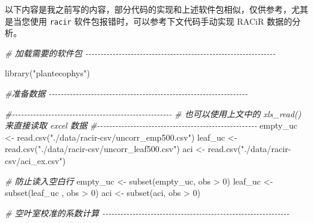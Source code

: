\documentclass[
]{krantz}
\makeatletter
\newenvironment{Shaded}{\begin{snugshade}}{\end{snugshade}}
\newcommand{\CommentTok}[1]{\textcolor[rgb]{0.56,0.35,0.01}{\textit{#1}}}
\newcommand{\DecValTok}[1]{\textcolor[rgb]{0.00,0.00,0.81}{#1}}
\newcommand{\FunctionTok}[1]{\textcolor[rgb]{0.00,0.00,0.00}{#1}}
\newcommand{\NormalTok}[1]{#1}
\newcommand{\OtherTok}[1]{\textcolor[rgb]{0.56,0.35,0.01}{#1}}
\newcommand{\SpecialCharTok}[1]{\textcolor[rgb]{0.00,0.00,0.00}{#1}}
\newcommand{\StringTok}[1]{\textcolor[rgb]{0.31,0.60,0.02}{#1}}
\newenvironment{kframe}{%
\medskip{}
\setlength{\fboxsep}{.8em}
 \def\at@end@of@kframe{}%
 \ifinner\ifhmode%
  \def\at@end@of@kframe{\end{minipage}}%
  \begin{minipage}{\columnwidth}%
 \fi\fi%
 \def\FrameCommand##1{\hskip\@totalleftmargin \hskip-\fboxsep
 \colorbox{shadecolor}{##1}\hskip-\fboxsep
     \hskip-\linewidth \hskip-\@totalleftmargin \hskip\columnwidth}%
 \MakeFramed {\advance\hsize-\width
   \@totalleftmargin\z@ \linewidth\hsize
   \@setminipage}}%
 {\par\unskip\endMakeFramed%
 \at@end@of@kframe}
\renewenvironment{Shaded}{\begin{kframe}}{\end{kframe}}
\makeatother
\begin{document}
以下内容是我之前写的内容，部分代码的实现和上述软件包相似，仅供参考，尤其是当您使用 \texttt{racir} 软件包报错时，可以参考下文代码手动实现 RACiR 数据的分析。

\begin{Shaded}
\begin{Highlighting}[]
\CommentTok{\# 加载需要的软件包  {-}{-}{-}{-}{-}{-}{-}{-}{-}{-}{-}{-}{-}{-}{-}{-}{-}{-}{-}{-}{-}{-}{-}{-}{-}{-}{-}{-}{-}{-}{-}{-}{-}{-}{-}{-}{-}{-}{-}{-}{-}{-}{-}{-}{-}{-}{-}{-}{-}{-}{-}{-}{-}{-}{-}{-}{-}{-}{-}{-}{-}{-}{-}}

\FunctionTok{library}\NormalTok{(}\StringTok{"plantecophys"}\NormalTok{)}

\CommentTok{\#准备数据 {-}{-}{-}{-}{-}{-}{-}{-}{-}{-}{-}{-}{-}{-}{-}{-}{-}{-}{-}{-}{-}{-}{-}{-}{-}{-}{-}{-}{-}{-}{-}{-}{-}{-}{-}{-}{-}{-}{-}{-}{-}{-}{-}{-}{-}{-}{-}{-}{-}{-}{-}{-}{-}{-}{-}{-}{-}{-}{-}{-}{-}{-}{-}{-}{-}{-}}

\CommentTok{\#{-}{-}{-}{-}{-}{-}{-}{-}{-}{-}{-}{-}{-}{-}{-}{-}{-}{-}{-}{-}{-}{-}{-}{-}{-}{-}{-}{-}{-}{-}{-}{-}{-}{-}{-}{-}{-}{-}{-}{-}{-}{-}{-}{-}{-}{-}{-}{-}{-}{-}{-}{-}{-}}
\CommentTok{\# 也可以使用上文中的 xls\_read() 来直接读取 excel 数据}
\CommentTok{\#{-}{-}{-}{-}{-}{-}{-}{-}{-}{-}{-}{-}{-}{-}{-}{-}{-}{-}{-}{-}{-}{-}{-}{-}{-}{-}{-}{-}{-}{-}{-}{-}{-}{-}{-}{-}{-}{-}{-}{-}{-}{-}{-}{-}{-}{-}{-}{-}{-}{-}{-}{-}{-}}
\NormalTok{empty\_uc }\OtherTok{\textless{}{-}} \FunctionTok{read.csv}\NormalTok{(}\StringTok{"./data/racir{-}csv/uncorr\_emp500.csv"}\NormalTok{)}
\NormalTok{leaf\_uc }\OtherTok{\textless{}{-}} \FunctionTok{read.csv}\NormalTok{(}\StringTok{"./data/racir{-}csv/uncorr\_leaf500.csv"}\NormalTok{)}
\NormalTok{aci }\OtherTok{\textless{}{-}} \FunctionTok{read.csv}\NormalTok{(}\StringTok{"./data/racir{-}csv/aci\_ex.csv"}\NormalTok{)}

\CommentTok{\# 防止读入空白行}
\NormalTok{empty\_uc }\OtherTok{\textless{}{-}} \FunctionTok{subset}\NormalTok{(empty\_uc, obs }\SpecialCharTok{\textgreater{}} \DecValTok{0}\NormalTok{)}
\NormalTok{leaf\_uc }\OtherTok{\textless{}{-}} \FunctionTok{subset}\NormalTok{(leaf\_uc , obs }\SpecialCharTok{\textgreater{}} \DecValTok{0}\NormalTok{)}
\NormalTok{aci }\OtherTok{\textless{}{-}} \FunctionTok{subset}\NormalTok{(aci, obs }\SpecialCharTok{\textgreater{}} \DecValTok{0}\NormalTok{)}

\CommentTok{\# 空叶室校准的系数计算 {-}{-}{-}{-}{-}{-}{-}{-}{-}{-}{-}{-}{-}{-}{-}{-}{-}{-}{-}{-}{-}{-}{-}{-}{-}{-}{-}{-}{-}{-}{-}{-}{-}{-}{-}{-}{-}{-}{-}{-}{-}{-}{-}{-}{-}{-}{-}{-}{-}{-}{-}{-}{-}{-}{-}{-}{-}{-}{-}{-}{-}{-}}


\end{Highlighting}
\end{Shaded}
\end{document}
